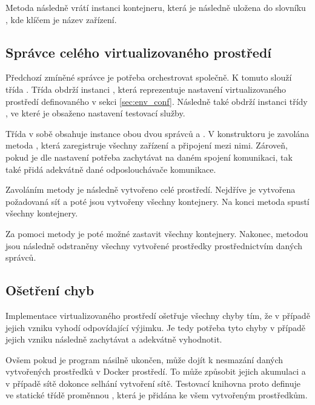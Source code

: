 Metoda  následně vrátí instanci kontejneru, která je následně uložena do slovníku , kde klíčem je název zařízení. 

\subsection{Správce celého virtualizovaného prostředí}

Předchozí zmíněné správce je potřeba orchestrovat společně. K tomuto slouží třída . Třída obdrží instanci , která reprezentuje nastavení virtualizovaného prostředí definovaného v sekci \ref{sec:env_conf}. Následně také obdrží instanci třídy , ve které je obsaženo nastavení testovací služby.

Třída v sobě obsahuje instance obou dvou správců  a . V konstruktoru je zavolána metoda , která zaregistruje všechny zařízení a připojení mezi nimi. Zároveň, pokud je dle nastavení potřeba zachytávat na daném spojení komunikaci, tak také přidá adekvátně dané odposlouchávače komunikace. 

Zavoláním metody  je následně vytvořeno celé prostředí. Nejdříve je vytvořena požadovaná síť a poté jsou vytvořeny všechny kontejnery. Na konci metoda spustí všechny kontejnery.

Za pomoci metody  je poté možné zastavit všechny kontejnery. Nakonec, metodou  jsou následně odstraněny všechny vytvořené prostředky prostřednictvím daných správců. 

\subsection{Ošetření chyb}

Implementace virtualizovaného prostředí ošetřuje všechny chyby tím, že v případě jejich vzniku vyhodí odpovídající výjimku. Je tedy potřeba tyto chyby v případě jejich vzniku následně zachytávat a adekvátně vyhodnotit.

Ovšem pokud je program násilně ukončen, může dojít k nesmazání daných vytvořených prostředků v Docker prostředí. To může způsobit jejich akumulaci a v případě sítě dokonce selhání vytvoření sítě. Testovací knihovna proto definuje ve statické třídě  proměnnou , která je přidána ke všem vytvořeným prostředkům.


